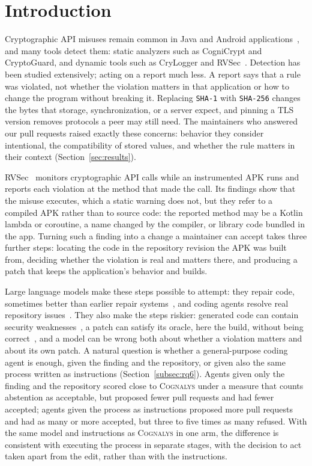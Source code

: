 \documentclass[conference]{IEEEtran}
\newcommand{\system}{\textsc{Cognalys}}
\begin{document}
\section{Introduction}
\label{sec:introduction}

Cryptographic API misuses remain common in Java and Android
applications~\cite{nadi2016hoops,torres2023runtime}, and many tools detect
them: static analyzers such as CogniCrypt and CryptoGuard, and dynamic tools
such as CryLogger and RVSec~\cite{krueger2017cognicrypt,krueger2021crysl,
rahaman2019cryptoguard,piccolboni2021crylogger,torres2023runtime}. Detection has
been studied extensively; acting on a report much less. A report says that a
rule was violated, not whether the violation matters in that application or how
to change the program without breaking it. Replacing \texttt{SHA-1} with
\texttt{SHA-256} changes the bytes that storage, synchronization, or a server
expect, and pinning a TLS version removes protocols a peer may still need. The
maintainers who answered our pull requests raised exactly these concerns:
behavior they consider intentional, the compatibility of stored values, and
whether the rule matters in their context (Section~\ref{sec:results}).

RVSec~\cite{torres2023runtime} monitors cryptographic API calls while an
instrumented APK runs and reports each violation at the method that made the
call. Its findings show that the misuse executes, which a static warning does
not, but they refer to a compiled APK rather than to source code: the reported
method may be a Kotlin lambda or coroutine, a name changed by the compiler, or
library code bundled in the app. Turning such a finding into a change a
maintainer can accept takes three further steps: locating the code in the
repository revision the APK was built from, deciding whether the violation is
real and matters there, and producing a patch that keeps the application's
behavior and builds.

Large language models make these steps possible to attempt: they repair code,
sometimes better than earlier repair
systems~\cite{xia2023apr,zhang2023apimisuse}, and coding agents resolve real
repository issues~\cite{jimenez2024swebench}. They also make the steps riskier: generated code can contain security
weaknesses~\cite{pearce2022asleep}, a patch can satisfy its oracle, here the
build, without being correct~\cite{smith2015overfitting}, and a model can be
wrong both about whether a violation matters and about its own patch. A
natural question is whether a general-purpose coding agent is enough, given the
finding and the repository, or given also the same process written as
instructions (Section~\ref{subsec:rq6}). Agents given only the finding and the
repository scored close to \system{} under a measure that counts abstention as
acceptable, but proposed fewer pull requests and had fewer accepted;
agents given the process as instructions proposed more pull requests and had as
many or more accepted, but three to five times as many refused. With the same
model and instructions as \system{} in one arm, the difference is consistent
with executing the process in separate stages, with the decision to act taken
apart from the edit, rather than with the instructions.
\end{document}
